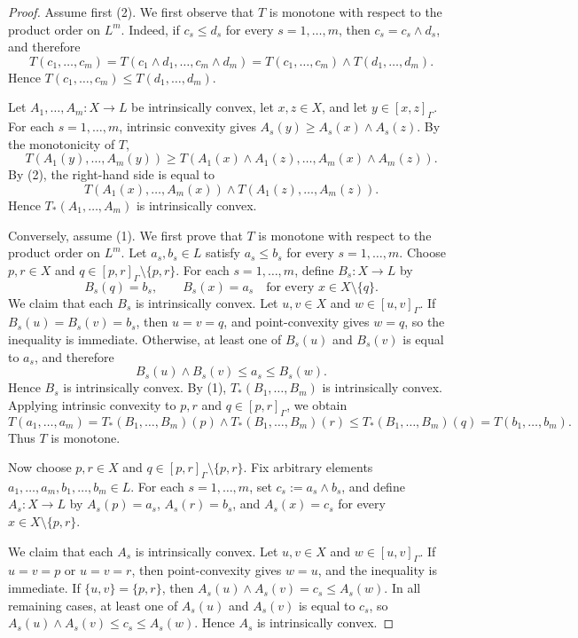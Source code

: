 \documentclass[11pt,a4paper]{article}
\begin{document}
\begin{proof}
Assume first (2). We first observe that \(T\) is monotone with respect to the product order on \(L^m\). Indeed, if \(c_s\leq d_s\) for every \(s=1,\dots,m\), then \(c_s=c_s\wedge d_s\), and therefore
\[
T(c_1,\dots,c_m)
=
T(c_1\wedge d_1,\dots,c_m\wedge d_m)
=
T(c_1,\dots,c_m)\wedge T(d_1,\dots,d_m).
\]
Hence \(T(c_1,\dots,c_m)\leq T(d_1,\dots,d_m)\).

Let \(A_1,\dots,A_m:X\to L\) be intrinsically convex, let \(x,z\in X\), and let \(y\in[x,z]_{\Gamma}\). For each \(s=1,\dots,m\), intrinsic convexity gives \(A_s(y)\geq A_s(x)\wedge A_s(z)\). By the monotonicity of \(T\),
\[
T(A_1(y),\dots,A_m(y))
\geq
T(A_1(x)\wedge A_1(z),\dots,A_m(x)\wedge A_m(z)).
\]
By (2), the right-hand side is equal to
\[
T(A_1(x),\dots,A_m(x))\wedge T(A_1(z),\dots,A_m(z)).
\]
Hence \(T_*(A_1,\dots,A_m)\) is intrinsically convex.

Conversely, assume (1). We first prove that \(T\) is monotone with respect to the product order on \(L^m\). Let \(a_s,b_s\in L\) satisfy \(a_s\leq b_s\) for every \(s=1,\dots,m\). Choose \(p,r\in X\) and \(q\in[p,r]_{\Gamma}\setminus\{p,r\}\). For each \(s=1,\dots,m\), define \(B_s:X\to L\) by
\[
B_s(q)=b_s,
\qquad
B_s(x)=a_s\quad\text{for every }x\in X\setminus\{q\}.
\]
We claim that each \(B_s\) is intrinsically convex. Let \(u,v\in X\) and \(w\in[u,v]_{\Gamma}\). If \(B_s(u)=B_s(v)=b_s\), then \(u=v=q\), and point-convexity gives \(w=q\), so the inequality is immediate. Otherwise, at least one of \(B_s(u)\) and \(B_s(v)\) is equal to \(a_s\), and therefore
\[
B_s(u)\wedge B_s(v)\leq a_s\leq B_s(w).
\]
Hence \(B_s\) is intrinsically convex. By (1), \(T_*(B_1,\dots,B_m)\) is intrinsically convex. Applying intrinsic convexity to \(p,r\) and \(q\in[p,r]_{\Gamma}\), we obtain
\[
T(a_1,\dots,a_m)
=
T_*(B_1,\dots,B_m)(p)
\wedge
T_*(B_1,\dots,B_m)(r)
\leq
T_*(B_1,\dots,B_m)(q)
=
T(b_1,\dots,b_m).
\]
Thus \(T\) is monotone.

Now choose \(p,r\in X\) and \(q\in[p,r]_{\Gamma}\setminus\{p,r\}\). Fix arbitrary elements \(a_1,\dots,a_m,b_1,\dots,b_m\in L\). For each \(s=1,\dots,m\), set \(c_s:=a_s\wedge b_s\), and define \(A_s:X\to L\) by \(A_s(p)=a_s\), \(A_s(r)=b_s\), and \(A_s(x)=c_s\) for every \(x\in X\setminus\{p,r\}\).

We claim that each \(A_s\) is intrinsically convex. Let \(u,v\in X\) and \(w\in[u,v]_{\Gamma}\). If \(u=v=p\) or \(u=v=r\), then point-convexity gives \(w=u\), and the inequality is immediate. If \(\{u,v\}=\{p,r\}\), then \(A_s(u)\wedge A_s(v)=c_s\le A_s(w)\). In all remaining cases, at least one of \(A_s(u)\) and \(A_s(v)\) is equal to \(c_s\), so \(A_s(u)\wedge A_s(v)\le c_s\le A_s(w)\). Hence \(A_s\) is intrinsically convex.


\end{proof}
\end{document}
